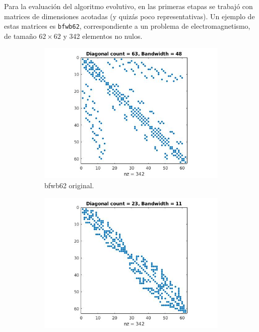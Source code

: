 Para la evaluación del algoritmo evolutivo, en las primeras etapas se trabajó con matrices de dimensiones acotadas (y quizás poco representativas). Un ejemplo de estas matrices es \texttt{bfwb62}, correspondiente a un problema  de electromagnetismo, de tamaño $62 \times 62$ y 342 elementos no nulos.
\begin{figure}
\centering
\begin{subfigure}[t]{.3\textwidth}
  \centering
  \includegraphics[width=\linewidth]{imagenes/chap4/bfwb62_spy.jpg}
  \caption{bfwb62 original.}
  \label{fig:bfwb62_spy}
\end{subfigure}%
\begin{subfigure}[t]{.3\textwidth}
  \centering
  \includegraphics[width=\linewidth]{imagenes/chap4/bfwb62_rcm_spy.jpg}

\end{subfigure}
\end{figure}
